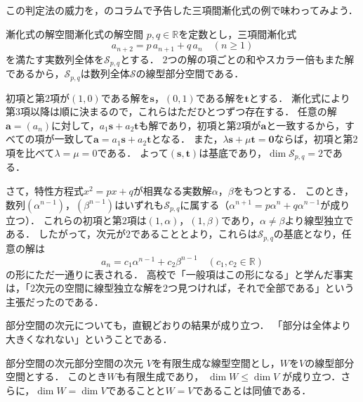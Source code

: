 この判定法の威力を，のコラムで予告した三項間漸化式の例で味わってみよう．

\begin{example}{漸化式の解空間}{漸化式の解空間}
  $p,q\in\mathbb{R}$を定数とし，三項間漸化式
  \[
    a_{n+2}=p\,a_{n+1}+q\,a_n \quad (n\ge1)
  \]
  を満たす実数列全体を$\mathcal{S}_{p,q}$とする．
  $2$つの解の項ごとの和やスカラー倍もまた解であるから，$\mathcal{S}_{p,q}$は数列全体$\mathcal{S}$の線型部分空間である．

  初項と第$2$項が$(1,0)$である解を$\bm{s}$，$(0,1)$である解を$\bm{t}$とする．
  漸化式により第$3$項以降は順に決まるので，これらはただひとつずつ存在する．
  任意の解$\bm{a}=(a_n)$に対して，$a_1\bm{s}+a_2\bm{t}$も解であり，初項と第$2$項が$\bm{a}$と一致するから，すべての項が一致して$\bm{a}=a_1\bm{s}+a_2\bm{t}$となる．
  また，$\lambda\bm{s}+\mu\bm{t}=\bm{0}$ならば，初項と第$2$項を比べて$\lambda=\mu=0$である．
  よって$(\bm{s},\bm{t})$は基底であり，$\dim\mathcal{S}_{p,q}=2$である．

  さて，特性方程式$x^2=px+q$が相異なる実数解$\alpha$，$\beta$をもつとする．
  このとき，数列$(\alpha^{n-1})$，$(\beta^{n-1})$はいずれも$\mathcal{S}_{p,q}$に属する（$\alpha^{n+1}=p\alpha^n+q\alpha^{n-1}$が成り立つ）．
  これらの初項と第$2$項は$(1,\alpha)$，$(1,\beta)$であり，$\alpha\ne\beta$より線型独立である．
  したがって，次元が$2$であることとより，これらは$\mathcal{S}_{p,q}$の基底となり，任意の解は
  \[
    a_n=c_1\alpha^{n-1}+c_2\beta^{n-1} \quad (c_1,c_2\in\mathbb{R})
  \]
  の形にただ一通りに表される．
  高校で「一般項はこの形になる」と学んだ事実は，「$2$次元の空間に線型独立な解を$2$つ見つければ，それで全部である」という主張だったのである．
\end{example}

部分空間の次元についても，直観どおりの結果が成り立つ．
「部分は全体より大きくなれない」ということである．

\begin{prop}{部分空間の次元}{部分空間の次元}
  $V$を有限生成な線型空間とし，$W$を$V$の線型部分空間とする．
  このとき$W$も有限生成であり，
  $\dim W \le \dim V$
  が成り立つ．さらに，$\dim W = \dim V$であることと$W = V$であることは同値である．
\end{prop}

